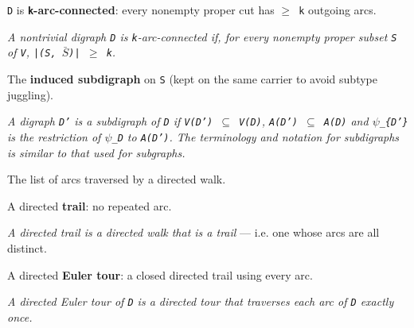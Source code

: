 \begin{definition}
\label{Digraph.IsKArcConnected}
\leanok
{}
\texttt{D} is \textbf{\texttt{k}-arc-connected}: every nonempty proper cut has \texttt{$\ge$ k} outgoing arcs.

\emph{A nontrivial digraph \texttt{D} is
\texttt{k}-arc-connected if, for every nonempty proper subset \texttt{S} of \texttt{V},
\texttt{|(S, $\bar{S}$)| $\ge$ k}.}
\end{definition}

\begin{definition}
\label{Digraph.induce}
\leanok
The \textbf{induced subdigraph} on \texttt{S} (kept on the same carrier to avoid subtype
juggling).

\emph{A digraph \texttt{D'} is a subdigraph of \texttt{D}
if \texttt{V(D') $\subseteq$ V(D)}, \texttt{A(D') $\subseteq$ A(D)} and
\texttt{$\psi$\_\{D'\}} is the restriction of \texttt{$\psi$\_D} to
\texttt{A(D')}.  The terminology and notation for subdigraphs is similar to that used for
subgraphs.}
\end{definition}

\begin{definition}
\label{Digraph.arcsOf}
The list of arcs traversed by a directed walk.
\end{definition}

\begin{definition}
\label{Digraph.IsDirectedTrail}
A directed \textbf{trail}: no repeated arc.

\emph{A directed trail is a directed walk
that is a trail} --- i.e. one whose arcs are all distinct.
\end{definition}

\begin{definition}
\label{Digraph.IsDirectedEulerTour}
\leanok
{}
A directed \textbf{Euler tour}: a closed directed trail using every arc.

\emph{A directed Euler tour of \texttt{D}
is a directed tour that traverses each arc of \texttt{D} exactly once.}
\end{definition}

